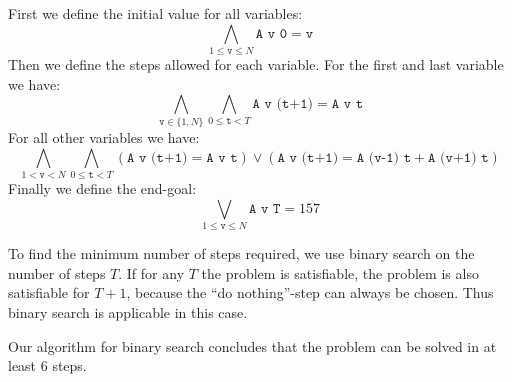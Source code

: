 \documentclass[12pt]{article}
\begin{document}
First we define the initial value for all variables:
\[ \bigwedge_{1 \le \texttt{v} \le N} \texttt{A v 0} = \texttt{v} \]
Then we define the steps allowed for each variable.
For the first and last variable we have:
\[ \bigwedge_{\texttt{v} \in \{1, N\}} \bigwedge_{0 \le \texttt{t} < T} \texttt{A v (t+1)} = \texttt{A v t} \]
For all other variables we have:
\[ \bigwedge_{1 < \texttt{v} < N} \bigwedge_{0 \le \texttt{t} < T} (\texttt{A v (t+1)} = \texttt{A v t}) \vee (\texttt{A v (t+1)} = \texttt{A (v-1) t} + \texttt{A (v+1) t}) \]
Finally we define the end-goal:
\[ \bigvee_{1 \le \texttt{v} \le N} \texttt{A v T} = 157 \]

To find the minimum number of steps required, we use binary search on the number of steps $T$.
If for any $T$ the problem is satisfiable, the problem is also satisfiable for $T+1$, because the ``do nothing''-step can always be chosen.
Thus binary search is applicable in this case.

Our algorithm for binary search concludes that the problem can be solved in at least 6 steps.
\end{document}
